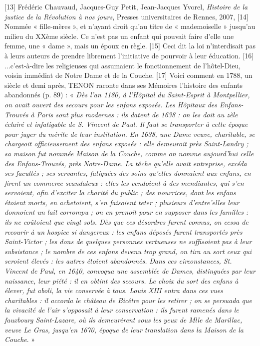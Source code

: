 [13] Frédéric Chauvaud, Jacques-Guy Petit, Jean-Jacques Yvorel, \emph{Histoire de la justice de la Révolution à nos jours}, Presses universitaires de Rennes, 2007,
[14] Nommée « fille-mères », et n'ayant droit qu'au titre de « mademoiselle » jusqu'au milieu du XXème siècle. Ce n'est pas un enfant qui pouvait faire d'elle une femme, une « dame », mais un époux en règle.
[15] Ceci dit la loi n'interdisait pas à leurs auteurs de prendre librement l'initiative de pourvoir à leur éducation.
[16] ...c'est-à-dire les religieuses qui assumaient le fonctionnement de l'hôtel-Dieu, voisin immédiat de Notre Dame et de la Couche.
[17] Voici comment en 1788, un siècle et demi après, TENON raconte dans ses Mémoires l'histoire des enfants abandonnés (p. 89) : « \emph{Dès l'an 1180, à l'Hôpital du Saint-Esprit à Montpellier, on avait ouvert des secours pour les enfans exposés. Les Hôpitaux des Enfans-Trouvés à Paris sont plus modernes : ils datent de 1638 : on les doit au zèle éclairé et infatigable de S. Vincent de Paul. Il faut se transporter à cette époque pour juger du mérite de leur institution.}
\emph{ En 1638, une Dame veuve, charitable, se chargeoit officieusement des enfans exposés : elle demeuroit près Saint-Landry ; sa maison fut nommée Maison de la Couche, comme on nomme aujourd'hui celle des Enfans-Trouvés, près Notre-Dame.}
\emph{La tâche qu'elle avait entreprise, excéda ses facultés ; ses servantes, fatiguées des soins qu'elles donnaient aux enfans, en firent un commerce scandaleux : elles les vendoient à des mendiantes, qui s'en servoient, afin d'exciter la charité du public ; des nourrices, dont les enfans étoient morts, en achetoient, s'en faisoient teter ; plusieurs d'entre'elles leur donnoient un lait corrompu ; on en prenoit pour en supposer dans les familles : ils ne coûtoient que vingt sols. Dès que ces désordres furent connus, on cessa de recourir à un hospice si dangereux : les enfans déposés furent transportés près Saint-Victor ; les dons de quelques personnes vertueuses ne suffisoient pas à leur subsistance ; le nombre de ces enfans devenu trop grand, on tira au sort ceux qui seroient élevés : les autres étoient abandonnés.}
\emph{Dans ces circonstances, St. Vincent de Paul, en 1640, convoqua une assemblée de Dames, distinguées par leur naissance, leur piété : il en obtint des secours. Le choix du sort des enfans à élever, fut aboli, la vie conservée à tous. Louis XIII entra dans ces vues charitables : il accorda le château de Bicêtre pour les retirer ; on se persuada que la vivacité de l'air s'opposait à leur conservation : ils furent ramenés dans le fauxbourg Saint-Lazare, où ils demeurèrent sous les yeux de Mlle de Marillac, veuve Le Gras, jusqu'en 1670, époque de leur translation dans la Maison de la Couche}. »
